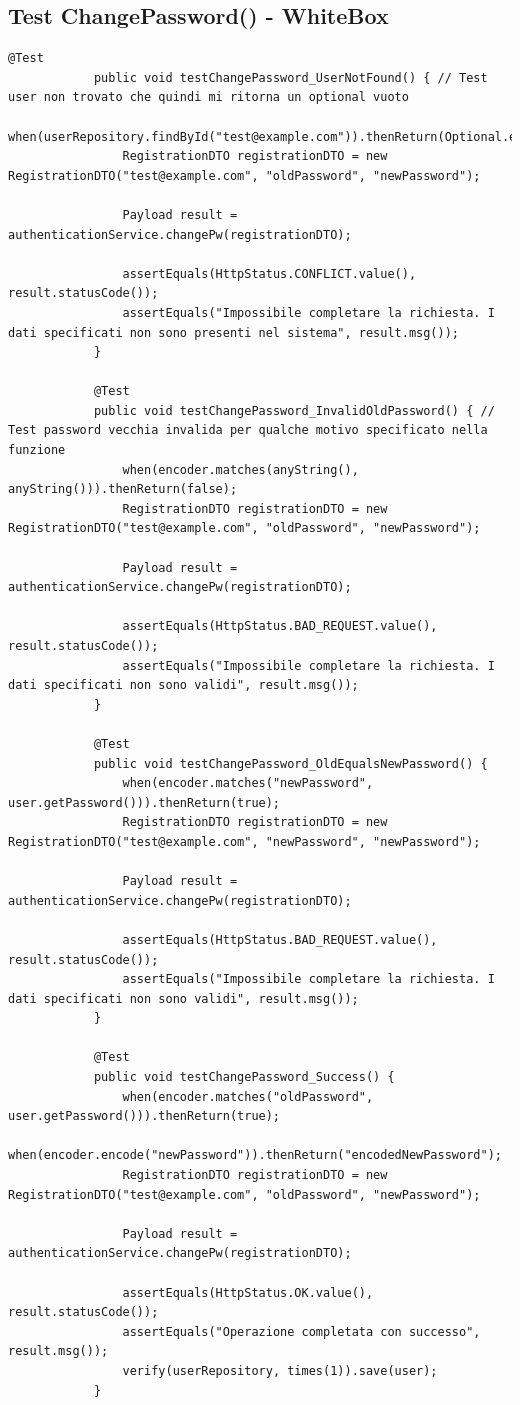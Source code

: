 \documentclass{article}
\begin{document}
		\subsection{Test ChangePassword() - WhiteBox}
		\begin{lstlisting}[style=JavaStyle, label={lst:java_code}]
			@Test
			public void testChangePassword_UserNotFound() { // Test user non trovato che quindi mi ritorna un optional vuoto
				when(userRepository.findById("test@example.com")).thenReturn(Optional.empty());
				RegistrationDTO registrationDTO = new RegistrationDTO("test@example.com", "oldPassword", "newPassword");
				
				Payload result = authenticationService.changePw(registrationDTO);
				
				assertEquals(HttpStatus.CONFLICT.value(), result.statusCode());
				assertEquals("Impossibile completare la richiesta. I dati specificati non sono presenti nel sistema", result.msg());
			}
			
			@Test
			public void testChangePassword_InvalidOldPassword() { // Test password vecchia invalida per qualche motivo specificato nella funzione
				when(encoder.matches(anyString(), anyString())).thenReturn(false);
				RegistrationDTO registrationDTO = new RegistrationDTO("test@example.com", "oldPassword", "newPassword");
				
				Payload result = authenticationService.changePw(registrationDTO);
				
				assertEquals(HttpStatus.BAD_REQUEST.value(), result.statusCode());
				assertEquals("Impossibile completare la richiesta. I dati specificati non sono validi", result.msg());
			}
			
			@Test
			public void testChangePassword_OldEqualsNewPassword() {
				when(encoder.matches("newPassword", user.getPassword())).thenReturn(true);
				RegistrationDTO registrationDTO = new RegistrationDTO("test@example.com", "newPassword", "newPassword");
				
				Payload result = authenticationService.changePw(registrationDTO);
				
				assertEquals(HttpStatus.BAD_REQUEST.value(), result.statusCode());
				assertEquals("Impossibile completare la richiesta. I dati specificati non sono validi", result.msg());
			}
			
			@Test
			public void testChangePassword_Success() {
				when(encoder.matches("oldPassword", user.getPassword())).thenReturn(true);
				when(encoder.encode("newPassword")).thenReturn("encodedNewPassword");
				RegistrationDTO registrationDTO = new RegistrationDTO("test@example.com", "oldPassword", "newPassword");
				
				Payload result = authenticationService.changePw(registrationDTO);
				
				assertEquals(HttpStatus.OK.value(), result.statusCode());
				assertEquals("Operazione completata con successo", result.msg());
				verify(userRepository, times(1)).save(user);
			}
		\end{lstlisting}
		
\end{document}
